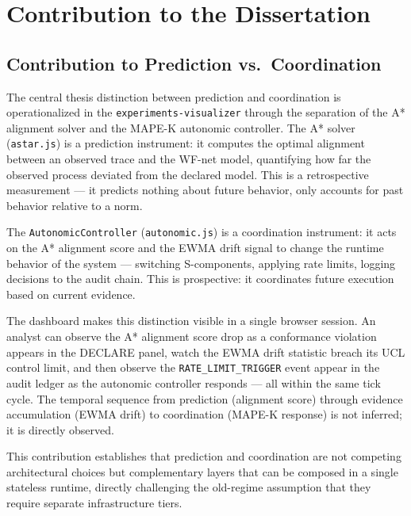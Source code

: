 
\section{Contribution to the Dissertation}
\label{sec:experiments-visualizer-contribution}

\subsection{Contribution to Prediction vs.~Coordination}
\label{sec:experiments-visualizer-contribution-prediction}

The central thesis distinction between prediction and coordination is operationalized in the
\texttt{experiments-visualizer} through the separation of the A* alignment solver and the
MAPE-K autonomic controller. The A* solver (\texttt{astar.js}) is a prediction instrument: it
computes the optimal alignment between an observed trace and the WF-net model, quantifying how
far the observed process deviated from the declared model. This is a retrospective measurement
— it predicts nothing about future behavior, only accounts for past behavior relative to a norm.

The \texttt{AutonomicController} (\texttt{autonomic.js}) is a coordination instrument: it
acts on the A* alignment score and the EWMA drift signal to change the runtime behavior of the
system — switching S-components, applying rate limits, logging decisions to the audit chain.
This is prospective: it coordinates future execution based on current evidence.

The dashboard makes this distinction visible in a single browser session. An analyst can
observe the A* alignment score drop as a conformance violation appears in the DECLARE panel,
watch the EWMA drift statistic breach its UCL control limit, and then observe the
\texttt{RATE\_LIMIT\_TRIGGER} event appear in the audit ledger as the autonomic controller
responds — all within the same tick cycle. The temporal sequence from prediction (alignment
score) through evidence accumulation (EWMA drift) to coordination (MAPE-K response) is not
inferred; it is directly observed.

This contribution establishes that prediction and coordination are not competing architectural
choices but complementary layers that can be composed in a single stateless runtime, directly
challenging the old-regime assumption that they require separate infrastructure tiers.


